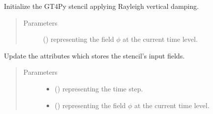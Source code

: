 \documentclass[letterpaper,10pt,english]{sphinxmanual}
\begin{document}
\begin{fulllineitems}
\begin{fulllineitems}
\begin{quote}
\begin{description}
\end{description}\end{quote}

\end{fulllineitems}


\begin{fulllineitems}
\label{\detokenize{api:tasmania.dycore.vertical_damping.VerticalDampingRayleigh._stencil_initialize}}
Initialize the GT4Py stencil applying Rayleigh vertical damping.
\begin{quote}\begin{description}
\item[{Parameters}] \leavevmode
{} () \textendash{}  representing the field \(\phi\) at the current time level.

\end{description}\end{quote}

\end{fulllineitems}


\begin{fulllineitems}
\label{\detokenize{api:tasmania.dycore.vertical_damping.VerticalDampingRayleigh._stencil_set_inputs}}
Update the attributes which stores the stencil’s input fields.
\begin{quote}\begin{description}
\item[{Parameters}] \leavevmode\begin{itemize}
\item {} 
 () \textendash{}  representing the time step.

\item {} 
 () \textendash{}  representing the field \(\phi\) at the current time level.


\end{itemize}
\end{description}
\end{quote}
\end{fulllineitems}
\end{fulllineitems}
\end{document}

